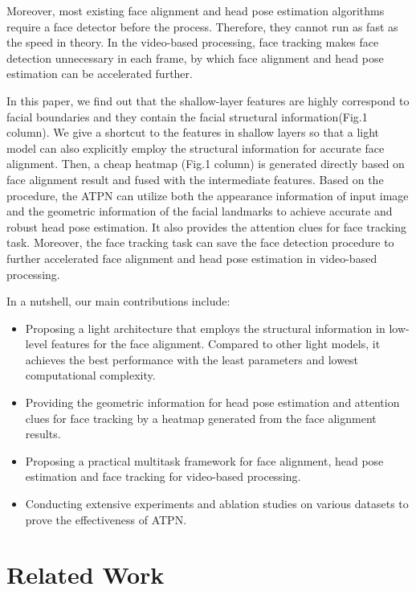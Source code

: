 \documentclass[3p,twocolumn, round, sort & compress]{elsarticle}
\begin{document}
Moreover, most existing face alignment and head pose estimation algorithms require a face detector before the process. Therefore, they cannot run as fast as the speed in theory. In the video-based processing, face tracking makes face detection unnecessary in each frame, by which face alignment and head pose estimation can be accelerated further.

In this paper, we find out that the shallow-layer features are highly correspond to facial boundaries and they contain the facial structural information(Fig.1  column). We give a shortcut to the features in shallow layers so that a light model can also explicitly employ the structural information for accurate face alignment. Then, a cheap heatmap (Fig.1  column) is generated directly based on face alignment result and fused with the intermediate features. Based on the procedure, the ATPN can utilize both the appearance information of input image and the geometric information of the facial landmarks to achieve accurate and robust head pose estimation. It also provides the attention clues for face tracking task. Moreover, the face tracking task can save the face detection procedure to further accelerated face alignment and head pose estimation in video-based processing. 


In a nutshell, our main contributions include:
\begin{itemize} 
	\item Proposing a light architecture that employs the structural information in low-level features for the face alignment. Compared to other light models, it achieves the best performance with the least parameters and lowest computational complexity.
	\item Providing the geometric information for head pose estimation and attention clues for face tracking by a heatmap generated from the face alignment results. 
	\item Proposing a practical multitask framework for face alignment, head pose estimation and face tracking for video-based processing.
	\item Conducting extensive experiments and ablation studies on various datasets to prove the effectiveness of ATPN.
\end{itemize}

\section{Related Work}
\end{document}
